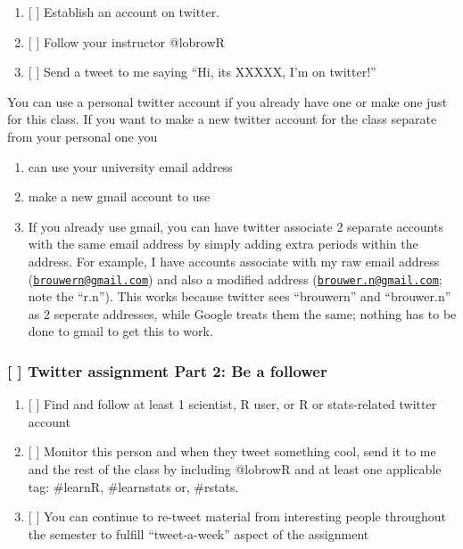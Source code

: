 \documentclass[]{article}
\providecommand{\tightlist}{%
  \setlength{\itemsep}{0pt}\setlength{\parskip}{0pt}}
\begin{document}
\begin{enumerate}
\def\labelenumi{\arabic{enumi}.}
\tightlist
\item
  {[} {]} Establish an account on twitter.\\
\item
  {[} {]} Follow your instructor @lobrowR
\item
  {[} {]} Send a tweet to me saying ``Hi, its XXXXX, I'm on twitter!''
\end{enumerate}

You can use a personal twitter account if you already have one or make
one just for this class. If you want to make a new twitter account for
the class separate from your personal one you

\begin{enumerate}
\def\labelenumi{\arabic{enumi}.}
\tightlist
\item
  can use your university email address
\item
  make a new gmail account to use
\item
  If you already use gmail, you can have twitter associate 2 separate
  accounts with the same email address by simply adding extra periods
  within the address. For example, I have accounts associate with my raw
  email address
  (\href{mailto:brouwern@gmail.com}{\nolinkurl{brouwern@gmail.com}}) and
  also a modified address
  (\href{mailto:brouwer.n@gmail.com}{\nolinkurl{brouwer.n@gmail.com}};
  note the ``r.n''). This works because twitter sees ``brouwern'' and
  ``brouwer.n'' as 2 seperate addresses, while Google treats them the
  same; nothing has to be done to gmail to get this to work.
\end{enumerate}

\subsubsection{{[} {]} Twitter assignment Part 2: Be a
follower}\label{twitter-assignment-part-2-be-a-follower}

\begin{enumerate}
\def\labelenumi{\arabic{enumi}.}
\tightlist
\item
  {[} {]} Find and follow at least 1 scientist, R user, or R or
  stats-related twitter account
\item
  {[} {]} Monitor this person and when they tweet something cool, send
  it to me and the rest of the class by including @lobrowR and at least
  one applicable tag: \#learnR, \#learnstats or, \#rstats.
\item
  {[} {]} You can continue to re-tweet material from interesting people
  throughout the semester to fulfill ``tweet-a-week'' aspect of the
  assignment
\end{enumerate}
\end{document}
